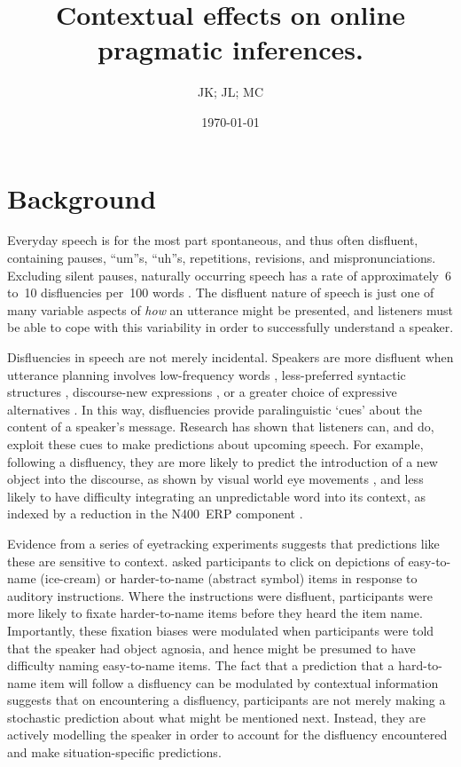 \documentclass[a4paper,man,natbib]{apa6}
\title{Contextual effects on online pragmatic inferences.}
\author{JK; JL; MC}
\date{\today}
\newcommand*{\spex}[1]{``{#1}''} %
\begin{document}
\maketitle


\section{Background}
Everyday speech is for the most part spontaneous, and thus often disfluent, containing pauses, \spex{um}s, \spex{uh}s, repetitions, revisions, and mispronunciations.
Excluding silent pauses, naturally occurring speech has a rate of approximately~6 to~10 disfluencies per~100 words \citep{Bortfeld2001,FoxTree1995}.
The disfluent nature of speech is just one of many variable aspects of \emph{how} an utterance might be presented, and listeners must be able to cope with this variability in order to successfully understand a speaker.

Disfluencies in speech are not merely incidental.  Speakers are more disfluent when utterance planning involves low-frequency words \citep{Beattie1979}, less-preferred syntactic structures \citep{Cook2009}, discourse-new expressions \citep{arnold2000heaviness}, or a greater choice of expressive alternatives \citep{Schachter1991}.
In this way, disfluencies provide paralinguistic `cues' about the content of a speaker's message.
Research has shown that listeners can, and do, exploit these cues to make predictions about upcoming speech.
For example, following a disfluency, they are more likely to predict the introduction of a new object into the discourse, as shown by visual world eye movements \citep{Arnold2004}, and less likely to have difficulty integrating an unpredictable word into its context, as indexed by a reduction in the N400~ERP component \citep{Corley2007}.

Evidence from a series of eyetracking experiments suggests that predictions like these are sensitive to context.
\citet{Arnold2007} asked participants to click on depictions of easy-to-name (ice-cream) or harder-to-name (abstract symbol) items in response to auditory instructions.
Where the instructions were disfluent, participants were more likely to fixate harder-to-name items before they heard the item name.
Importantly, these fixation biases were modulated when participants were told that the speaker had object agnosia, and hence might be presumed to have difficulty naming easy-to-name items.
The fact that a prediction that a hard-to-name item will follow a disfluency can be modulated by contextual information suggests that on encountering a disfluency, participants are not merely making a stochastic prediction about what might be mentioned next.
Instead, they are actively modelling the speaker in order to account for the disfluency encountered and make situation-specific predictions.
\end{document}
